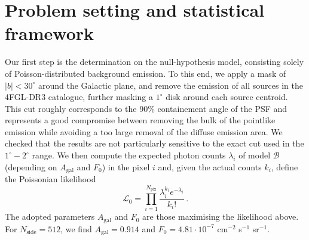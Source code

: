 \section{Problem setting and statistical framework}
\label{sec:procedure}
Our first step is the determination on the null-hypothesis model, consisting solely 
of Poisson-distributed background emission.
%
To this end, we apply a mask of  $|b|<30^\circ$ around the Galactic plane, and remove the emission of all 
sources in the 4FGL-DR3 catalogue, further masking a $1^\circ$ disk around each source centroid. This cut roughly corresponds to the 90\% containement angle of the PSF and represents a good compromise between removing the bulk of the pointlike emission while avoiding a too large removal of the diffuse emission area. We checked that the results are not particularly sensitive to the exact cut used in the $1^\circ-2^\circ$ range. 
%
We then compute the expected photon counts $\lambda_i$ of model $\mathcal{B}$ (depending on $A_\textrm{gal}$  and $ F_{0}$) in the pixel $i$  and, given the actual counts $k_i$, define the Poissonian likelihood  
\begin{equation}
\mathcal{L}_0=\prod_{i=1}^{N_\textrm{pix}} \frac{\lambda_i^{k_i}e^{-{\lambda_i}}}{k_i!}\, .
\end{equation}
The adopted parameters $A_\textrm{gal}$  and $ F_{0}$ are those maximising the likelihood above. For $N_\textrm{side}=512$, we find $A_\textrm{gal}=0.914$ and $F_0=4.81\cdot 10^{-7}$ cm$^{-2}$ s$^{-1}$ sr$^{-1}$.
%


